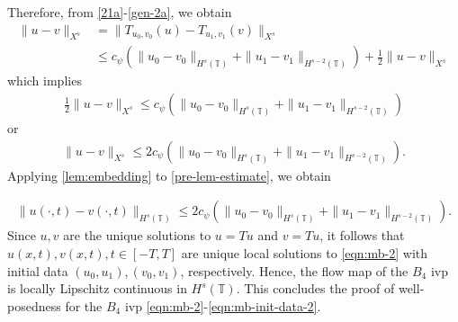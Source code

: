 \documentclass[12pt,reqno]{amsart}
\numberwithin{equation}{section}  %
\numberwithin{figure}{section}
\newcommand{\ci}{\mathbb{T}}
\theoremstyle{plain}
\theoremstyle{definition}
\theoremstyle{remark}
\begin{document}
%
%
Therefore, from \eqref{21a}-\eqref{gen-2a}, we obtain
%
%
\begin{equation*}
	\begin{split}
    \|u -v \|_{X^{s}}
    & = \|T_{u_0, v_0}(u) - T_{u_1, v_1}(v) \|_{X^{s}}
    \\
    & \le
    c_{\psi} \left( \|u_0 -v_0 \|_{H^s\left( \ci \right)} +\|u_1 -v_1
        \|_{H^{s-2}\left( \ci \right)} \right )
        + \frac{1}{2} \|u -v \|_{X^{s}}
  \end{split}
\end{equation*}
%
%
which implies
%
%
\begin{equation*}
	\begin{split}
		\frac{1}{2} \|u-v\|_{X^{s}} \le
    c_{\psi} \left( \|u_0 -v_0 \|_{H^s\left( \ci \right)} +\|u_1 -v_1
        \|_{H^{s-2}\left( \ci \right)} \right )
      \end{split}
\end{equation*}
%
%
or
%
%
\begin{equation}
	\begin{split}
		\|u -v \|_{X^{s}} \le 2 c_{\psi} \left( \|u_0 -v_0 \|_{H^s\left( \ci \right)} +\|u_1 -v_1
        \|_{H^{s-2}\left( \ci \right)} \right ).
	\end{split}
  \label{pre-lem-estimate}
\end{equation}
%
%
Applying  
\autoref{lem:embedding} to \eqref{pre-lem-estimate}, we obtain 

%
%
%
	 \begin{equation*}
		 \begin{split}
			\|u(\cdot, t) -v(\cdot, t) \|_{H^s(\ci)} \le
      2 c_{\psi} \left( \|u_0 -v_0 \|_{H^s\left( \ci \right)} +\|u_1 -v_1
        \|_{H^{s-2}\left( \ci \right)} \right ).
		 \end{split}
	 \end{equation*}
Since $u,v$ are the unique solutions to $u = Tu$ and $v = Tu$,
it follows that $u(x,t), v(x,t), t \in [-T, T]$ are unique
local solutions to \eqref{eqn:mb-2} with
initial data $(u_0, u_1), (v_0, v_1)$, respectively.
Hence, the flow map of the $B_4$ ivp is locally Lipschitz continuous in
$H^s(\ci)$. This
concludes the proof of well-posedness for the $B_4$ ivp
\eqref{eqn:mb-2}-\eqref{eqn:mb-init-data-2}. \qquad \qedsymbol

%
%
%
%
%
%
%
%
%
%
%
%
%
%
\end{document}
